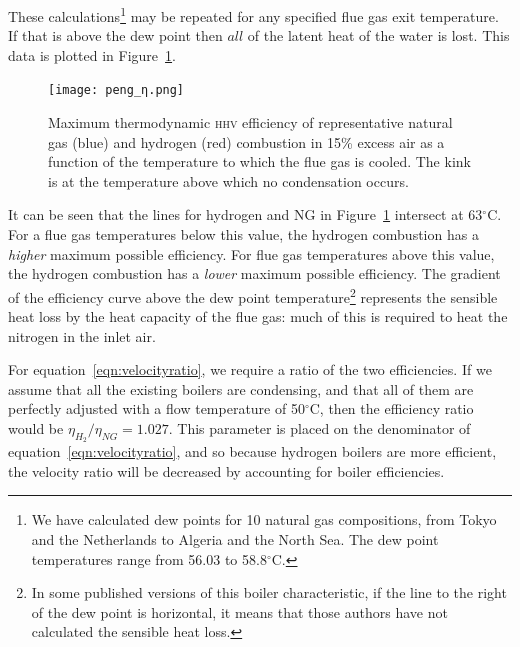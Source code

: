\documentclass[5p]{elsarticle} %
\begin{document}
These calculations\footnote{
We have calculated dew points for 10 natural gas compositions, from Tokyo and the Netherlands to Algeria and the North Sea. The dew point temperatures range from 56.03 to 58.8$^\circ$C\citep{Sargents_github}.
} may be repeated for any specified flue gas exit temperature. 
If 
that
is above the dew point 
then $all$ of the latent heat of the water is lost.
This data is plotted in Figure~\ref{fig:efficiency}.

\begin{figure}[ht]
    \centering
    \texttt{[image: peng\_η.png]}
    \caption{ Maximum thermodynamic \textsc{hhv} efficiency of representative natural gas (blue) and hydrogen (red) combustion in 15\% excess air as a function of the temperature to which the flue gas is cooled. The kink is at the temperature above which no condensation occurs. }
    \label{fig:efficiency}
\end{figure}

It can be seen that the lines for hydrogen and NG in Figure~\ref{fig:efficiency} intersect at 63$^\circ$C.
For a flue gas temperatures below this value, the hydrogen combustion has a \emph{higher} maximum possible efficiency.
For flue gas temperatures above this value, the hydrogen combustion has a \emph{lower} maximum possible efficiency.
The gradient of the efficiency curve above the dew point temperature\footnote{In some published versions of this boiler characteristic, if the line to the right of the dew point is horizontal, it means that those authors have not calculated the sensible heat loss. 
} represents the sensible heat loss by the heat capacity of the flue gas: much of this is 
required to heat the nitrogen in the inlet air. 

For equation~\eqref{eqn:velocityratio}, we require a ratio of the two efficiencies.
If we assume that all the existing boilers are condensing, and that all of them are perfectly adjusted with a flow temperature of 50$^\circ$C, then the efficiency ratio would be $\eta_{H_2} / \eta_{NG}  = 1.027$.
This parameter is placed on the denominator of equation~\eqref{eqn:velocityratio}, and so because hydrogen boilers are more efficient, the velocity ratio will be decreased by accounting for boiler efficiencies.
\end{document}
